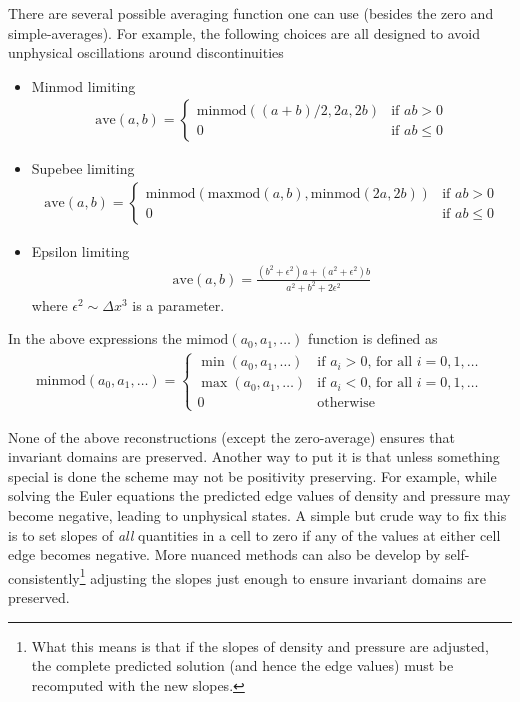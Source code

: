 \documentclass[11pt, reqno]{amsart}
\theoremstyle{definition}
\begin{document}
There are several possible averaging function one can use (besides the
zero and simple-averages). For example, the following choices are all
designed to avoid unphysical oscillations around discontinuities
\begin{itemize}
  \item Minmod limiting
    \begin{align}
      \mathrm{ave}(a,b) = 
      \begin{cases}
        \mathrm{minmod}((a+b)/2, 2a, 2b)& \text{if $ab>0$} \\
        0& \text{if $ab\le 0$}
      \end{cases}
    \end{align}

  \item Supebee limiting
    \begin{align}
      \mathrm{ave}(a,b) = 
      \begin{cases}
        \mathrm{minmod}\left(
          \mathrm{maxmod}(a,b), \mathrm{minmod}(2a,2b)
          \right)& \text{if $ab>0$} \\
        0& \text{if $ab\le 0$}
      \end{cases}
    \end{align}

  \item Epsilon limiting
    \begin{align}
      \mathrm{ave}(a,b) = \frac{(b^2+\epsilon^2)a + (a^2+\epsilon^2)b}{a^2+b^2+2\epsilon^2}
    \end{align}
    where $\epsilon^2 \sim \Delta x^3$ is a parameter.
\end{itemize}
In the above expressions the $\mathrm{mimod}(a_0,a_1,\ldots)$ function
is defined as
\begin{align}
  \mathrm{minmod}(a_0,a_1,\ldots) =
  \begin{cases}
    \min(a_0,a_1,\ldots)& \text{if $a_i>0$, for all $i=0,1,\ldots$} \\
    \max(a_0,a_1,\ldots)& \text{if $a_i<0$, for all $i=0,1,\ldots$} \\
    0& \text{otherwise}
  \end{cases}
\end{align}

None of the above reconstructions (except the zero-average) ensures
that invariant domains are preserved. Another way to put it is that
unless something special is done the scheme may not be positivity
preserving. For example, while solving the Euler equations the
predicted edge values of density and pressure may become negative,
leading to unphysical states. A simple but crude way to fix this is to
set slopes of \emph{all} quantities in a cell to zero if any of the
values at either cell edge becomes negative. More nuanced methods can
also be develop by self-consistently\footnote{What this means is that
  if the slopes of density and pressure are adjusted, the complete
  predicted solution (and hence the edge values) must be recomputed
  with the new slopes.} adjusting the slopes just enough to ensure
invariant domains are preserved.
\end{document}
